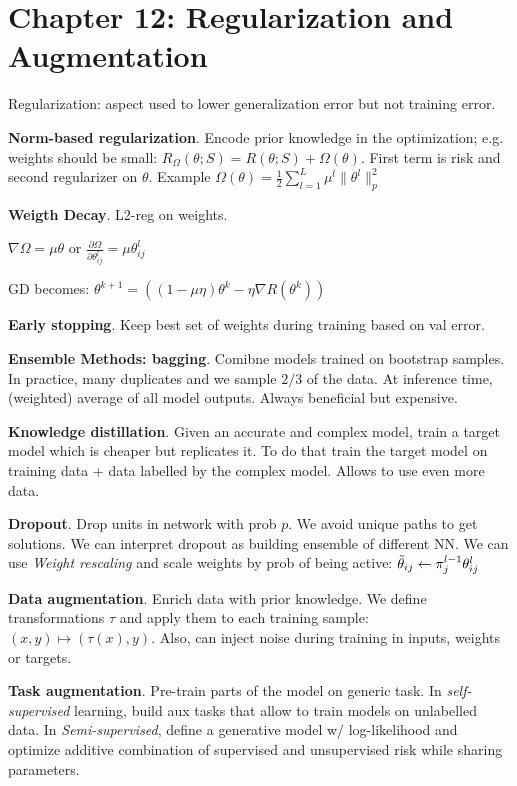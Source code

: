 \section*{Chapter 12: Regularization and Augmentation}
Regularization: aspect used to lower generalization error but not training error.

\textbf{Norm-based regularization}. Encode prior knowledge in the optimization; e.g. weights should be small: $R_\Omega(\theta; S) = R(\theta; S) + \Omega(\theta)$. First term is risk and second regularizer on $\theta$. Example 
$\Omega(\theta) = \frac{1}{2}\sum_{l=1}^{L}\mu^l\|\theta^l\|_p^2$

\textbf{Weigth Decay}. L2-reg on weights. 

$\nabla\Omega = \mu\theta$ or $\frac{\partial\Omega}{\partial\theta_{ij}^l} = \mu\theta_{ij}^l$

GD becomes: $\theta^{k+1} = ((1-\mu\eta)\theta^k - \eta \nabla R(\theta^k))$

\textbf{Early stopping}. Keep best set of weights during training based on val error.

\textbf{Ensemble Methods: bagging}. Comibne models trained on bootstrap samples. In practice, many duplicates and we sample $2/3$ of the data. At inference time, (weighted) average of all model outputs. Always beneficial but expensive.

\textbf{Knowledge distillation}. Given an accurate and complex model, train a target model which is cheaper but replicates it. To do that train the target model on training data + data labelled by the complex model. Allows to use even more data.

\textbf{Dropout}. Drop units in network with prob $p$. We avoid unique paths to get solutions. We can interpret dropout as building ensemble of different NN. We can use \emph{Weight rescaling} and scale weights by prob of being active: $\Tilde{\theta}_{ij} \leftarrow \pi_j^{l-1}\theta_{ij}^l$

\textbf{Data augmentation}. Enrich data with prior knowledge. We define transformations $\tau$ and apply them to each training sample: $(x, y) \mapsto (\tau(x), y)$. Also, can inject noise during training in inputs, weights or targets.

\textbf{Task augmentation}. Pre-train parts of the model on generic task. In \emph{self-supervised} learning, build aux tasks that allow to train models on unlabelled data. In \emph{Semi-supervised}, define a generative model w/ log-likelihood and optimize additive combination of supervised and unsupervised risk while sharing parameters.